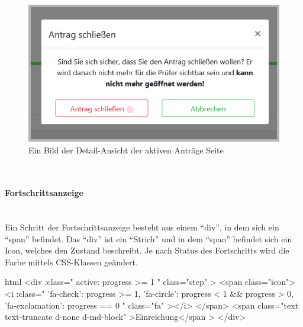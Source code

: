 \begin{figure}[H]
	\centering
	\includegraphics[width=0.6\linewidth]{images/website/antrag_schliessen}
	\caption[Aktiv]{Ein Bild der Detail-Ansicht der aktiven Anträge Seite}
	\label{fig:antragaktivdetail}
\end{figure}

~\\
\paragraph{Fortschrittsanzeige}
~\\
Ein Schritt der Fortschrittsanzeige besteht aus einem \enquote{div}, in dem sich ein \enquote{span} befindet. Das \enquote{div} ist ein \enquote{Strich} und in dem \enquote{span} befindet sich ein Icon, welches den Zustand beschreibt. Je nach Status des Fortschritts wird die Farbe mittels CSS-Klassen geändert.
\begin{code}{html}
	<div
            :class="{
              active: progress >= 1
            }"
            class="step"
          >
            <span class="icon">
              <i
                :class="{
                  'fa-check': progress >= 1,
                  'fa-circle': progress < 1 && progress > 0,
                  'fa-exclamation': progress == 0
                }"
                class="fa"
              ></i>
            </span>
            <span class="text text-truncate d-none d-md-block"
              >Einreichung</span
            >
          </div>
\end{code}
	\label{list:codeprogress} ~\\

	\label{list:progresscolor} ~\\

